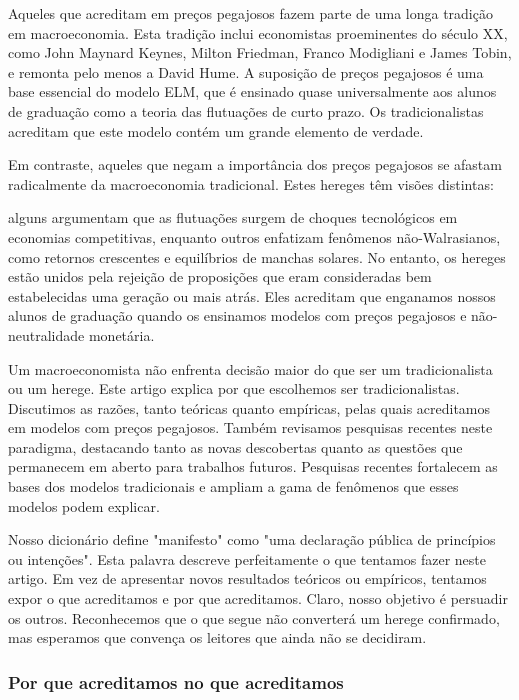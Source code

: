 \documentclass[a4paper,12pt]{article}[abntex2]
\begin{document}
Aqueles que acreditam em preços pegajosos fazem parte de uma longa tradição em macroeconomia. Esta tradição inclui economistas proeminentes do século XX, como John Maynard Keynes, Milton Friedman, Franco Modigliani e James Tobin, e remonta pelo menos a David Hume. A suposição de preços pegajosos é uma base essencial do modelo ELM, que é ensinado quase universalmente aos alunos de graduação como a teoria das flutuações de curto prazo. Os tradicionalistas acreditam que este modelo contém um grande elemento de verdade.

Em contraste, aqueles que negam a importância dos preços pegajosos se afastam radicalmente da macroeconomia tradicional. Estes hereges têm visões distintas:

alguns argumentam que as flutuações surgem de choques tecnológicos em economias competitivas, enquanto outros enfatizam fenômenos não-Walrasianos, como retornos crescentes e equilíbrios de manchas solares. No entanto, os hereges estão unidos pela rejeição de proposições que eram consideradas bem estabelecidas uma geração ou mais atrás. Eles acreditam que enganamos nossos alunos de graduação quando os ensinamos modelos com preços pegajosos e não-neutralidade monetária.

Um macroeconomista não enfrenta decisão maior do que ser um tradicionalista ou um herege. Este artigo explica por que escolhemos ser tradicionalistas. Discutimos as razões, tanto teóricas quanto empíricas, pelas quais acreditamos em modelos com preços pegajosos. Também revisamos pesquisas recentes neste paradigma, destacando tanto as novas descobertas quanto as questões que permanecem em aberto para trabalhos futuros. Pesquisas recentes fortalecem as bases dos modelos tradicionais e ampliam a gama de fenômenos que esses modelos podem explicar.

Nosso dicionário define "manifesto" como "uma declaração pública de princípios ou intenções". Esta palavra descreve perfeitamente o que tentamos fazer neste artigo. Em vez de apresentar novos resultados teóricos ou empíricos, tentamos expor o que acreditamos e por que acreditamos. Claro, nosso objetivo é persuadir os outros. Reconhecemos que o que segue não converterá um herege confirmado, mas esperamos que convença os leitores que ainda não se decidiram.

\subsubsection{\textbf{Por que acreditamos no que acreditamos}}
\end{document}
